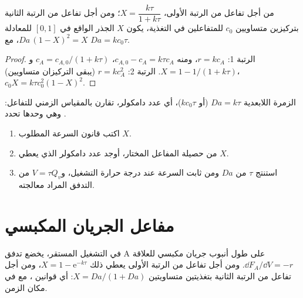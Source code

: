 \begin{theorem}\label{thm:b2:continuous-reactors:cstr}
من أجل تفاعل من الرتبة الأولى، $X = \dfrac{k\tau}{1 + k\tau}$؛ ومن أجل تفاعل
من الرتبة الثانية بتركيزين متساويين $c_0$ للمتفاعلين في التغذية، يكون
$X$ الجذر الواقع في $[0, 1]$ للمعادلة $Da\,(1 - X)^2 = X$، مع $Da =
kc_0\tau$.
\end{theorem}

\begin{proof}
الرتبة 1: $r = kc_A$، ومنه $c_{A,0} - c_A = k\tau c_A$، $c_A = c_{A,0}/(1 + k\tau)$
و$X = 1 - 1/(1 + k\tau)$. الرتبة 2: $r = kc_A^2$ (يبقى التركيزان
متساويين)، $c_0X = k\tau c_0^2(1 - X)^2$.
\end{proof}

الزمرة اللابعدية $Da = k\tau$ (أو $kc_0\tau$)، أي عدد دامكولر، تقارن  بالمقياس الزمني للتفاعل:
وهي وحدها تحدد .

\begin{method}\label{met:b2:continuous-reactors:size-reactor}
\begin{enumerate}
  \item اكتب قانون السرعة  المطلوب $X$.
  \item من حصيلة المفاعل المختار، أوجد عدد دامكولر
        الذي يعطي $X$.
  \item استنتج $\tau$ من $Da$ ومن ثابت السرعة عند درجة حرارة
        التشغيل، و$V = \tau Q_v$ من التدفق المراد معالجته.
\end{enumerate}
\end{method}

\section{مفاعل الجريان المكبسي}

\begin{theorem}\label{thm:b2:continuous-reactors:pfr}
في التشغيل المستقر، يخضع تدفق A على طول أنبوب جريان مكبسي
للعلاقة $\dd F_A/\dd V = -r$. ومن أجل تفاعل من الرتبة الأولى يعطي ذلك $X = 1 -
\mathrm e^{-k\tau}$، ومن أجل تفاعل من الرتبة الثانية بتغذيتين متساويتين $X =
Da/(1 + Da)$: أي قوانين ، مع  في
مكان الزمن.
\end{theorem}

